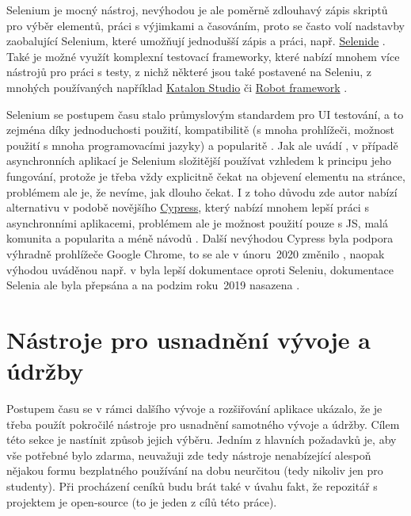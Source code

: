 Selenium je mocný nástroj, nevýhodou je ale poměrně zdlouhavý zápis skriptů pro výběr elementů, práci s výjimkami a časováním, proto se často volí nadstavby zaobalující Selenium, které umožňují jednodušší zápis a práci, např. \href{https://selenide.org/}{Selenide} \cite{test-hackernoon1}. Také je možné využít komplexní testovací frameworky, které nabízí mnohem více nástrojů pro práci s testy, z nichž některé jsou také postavené na Seleniu, z mnohých používaných například \href{https://www.katalon.com/}{Katalon Studio} či \href{https://robotframework.org/}{Robot framework} \cite{test-selenium3, test-katalon}.

Selenium se postupem času stalo průmyslovým standardem pro UI testování, a to zejména díky jednoduchosti použití, kompatibilitě (s mnoha prohlížeči, možnost použití s mnoha programovacími jazyky) a popularitě \cite{test-selenium1}. Jak ale uvádí \cite{test-cypress1}, v případě asynchronních aplikací je Selenium složitější používat vzhledem k principu jeho fungování, protože je třeba vždy explicitně čekat na objevení elementu na stránce, problémem ale je, že nevíme, jak dlouho čekat. I z toho důvodu zde autor nabízí alternativu v podobě novějšího \href{https://www.cypress.io/}{Cypress}, který nabízí mnohem lepší práci s asynchronními aplikacemi, problémem ale je možnost použití pouze s JS, malá komunita a popularita a méně návodů \cite{test-cypress1}. Další nevýhodou Cypress byla podpora výhradně prohlížeče Google Chrome, to se ale v únoru~2020 změnilo \cite{test-cypress2}, naopak výhodou uváděnou např. v \cite{test-cypress3} byla lepší dokumentace oproti Seleniu, dokumentace Selenia ale byla přepsána a na podzim roku~2019 nasazena \cite{test-selenium2}.

\chapter{Nástroje pro usnadnění vývoje a údržby}\label{chap:nastrojeprousnadnenivyvojeaudrzby}

Postupem času se v rámci dalšího vývoje a rozšiřování aplikace ukázalo, že je třeba použít pokročilé nástroje pro usnadnění samotného vývoje a údržby. Cílem této sekce je nastínit způsob jejich výběru. Jedním z hlavních požadavků je, aby vše potřebné bylo zdarma, neuvažuji zde tedy nástroje nenabízející alespoň nějakou formu bezplatného používání na dobu neurčitou (tedy nikoliv jen pro studenty). Při procházení ceníků budu brát také v úvahu fakt, že repozitář s projektem je open-source (to je jeden z cílů této práce). 

